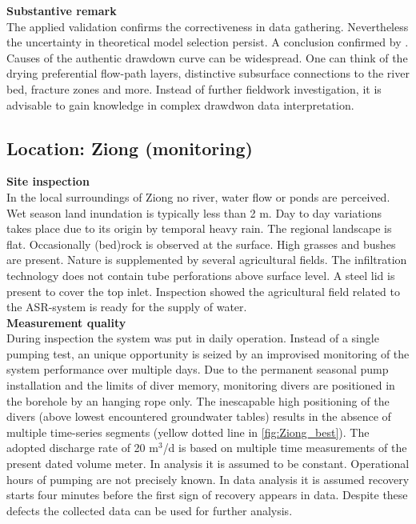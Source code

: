 \textbf{Substantive remark} \\
The applied validation confirms the correctiveness in data gathering. Nevertheless the uncertainty in theoretical model selection persist. A conclusion confirmed by \citet{Kruseman2000}. Causes of the authentic drawdown curve can be widespread. One can think of the drying preferential flow-path  layers, distinctive subsurface connections to the river bed, fracture zones and more. Instead of further fieldwork investigation, it is advisable to gain knowledge in complex drawdwon data interpretation. 

\subsection{Location: Ziong (monitoring)}

\textbf{Site inspection} \\
In the local surroundings of Ziong no river, water flow or ponds are perceived. Wet season land inundation is typically less than 2 m. Day to day variations takes place due to its origin by temporal heavy rain. The regional landscape is flat. Occasionally (bed)rock is observed at the surface. High grasses and bushes are present. Nature is supplemented by several agricultural fields. The infiltration technology does not contain tube perforations above surface level. A steel lid is present to cover the top inlet. Inspection showed the agricultural field related to the ASR-system is ready for the supply of water. \\

\textbf{Measurement quality} \\
During inspection the system was put in daily operation. Instead of a single pumping test, an unique opportunity is seized by an improvised monitoring of the system performance over multiple days. Due to the permanent seasonal pump installation and the limits of diver memory, monitoring divers are positioned in the borehole by an hanging rope only. The inescapable high positioning of the divers (above lowest encountered groundwater tables) results in the absence of multiple time-series segments (yellow dotted line in \ref{fig:Ziong_best}). The adopted discharge rate of 20 m$^3$/d is based on multiple time measurements of the present dated volume meter. In analysis it is assumed to be constant. Operational hours of pumping are not precisely known. In data analysis it is assumed recovery starts four minutes before the first sign of recovery appears in data. Despite these defects the collected data can be used for further analysis. \\

